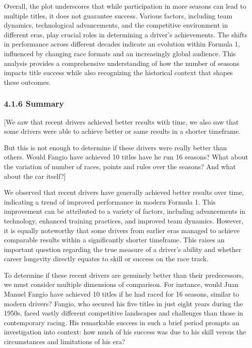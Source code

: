 \documentclass[
]{article}
\begin{document}
Overall, the plot underscores that while participation in more seasons
can lead to multiple titles, it does not guarantee success. Various
factors, including team dynamics, technological advancements, and the
competitive environment in different eras, play crucial roles in
determining a driver's achievements. The shifts in performance across
different decades indicate an evolution within Formula 1, influenced by
changing race formats and an increasingly global audience. This analysis
provides a comprehensive understanding of how the number of seasons
impacts title success while also recognizing the historical context that
shapes these outcomes.

\newpage

\subsubsection{4.1.6 Summary}\label{summary}

{[}We saw that recent drivers achieved better results with time, we also
saw that some drivers were able to achieve better or same results in a
shorter timeframe.

But this is not enough to determine if these drivers were really better
than others. Would Fangio have achieved 10 titles have he run 16
seasons? What about the variation of number of races, points and rules
over the seasons? And what about the car itself?{]}

We observed that recent drivers have generally achieved better results
over time, indicating a trend of improved performance in modern Formula
1. This improvement can be attributed to a variety of factors, including
advancements in technology, enhanced training practices, and improved
team dynamics. However, it is equally noteworthy that some drivers from
earlier eras managed to achieve comparable results within a
significantly shorter timeframe. This raises an important question
regarding the true measure of a driver's ability and whether career
longevity directly equates to skill or success on the race track.

To determine if these recent drivers are genuinely better than their
predecessors, we must consider multiple dimensions of comparison. For
instance, would Juan Manuel Fangio have achieved 10 titles if he had
raced for 16 seasons, similar to modern drivers? Fangio, who secured his
five titles in just eight years during the 1950s, faced vastly different
competitive landscapes and challenges than those in contemporary racing.
His remarkable success in such a brief period prompts an investigation
into context: how much of his success was due to his skill versus the
circumstances and limitations of his era?
\end{document}
